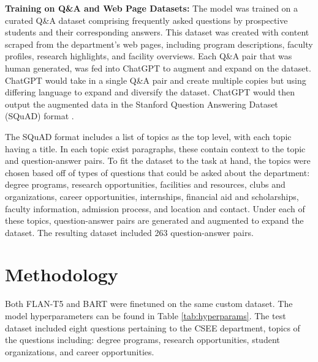 \documentclass[conference]{IEEEtran}
\begin{document}
\noindent
\textbf{Training on Q\&A and Web Page Datasets:} The model was trained on a curated Q\&A dataset comprising frequently asked questions by prospective students and their corresponding answers. 
This dataset was created with content scraped from the department's web pages, including program descriptions, faculty profiles, research highlights, and facility overviews. 
Each Q\&A pair that was human generated, was fed into ChatGPT to augment and expand on the dataset. ChatGPT would take in a single Q\&A pair and create multiple copies but using differing language to expand and diversify the dataset.
ChatGPT would then output the augmented data in the Stanford Question Answering Dataset (SQuAD) format \cite{b8}.

The SQuAD format includes a list of topics as the top level, with each topic having a title. In each topic exist paragraphs, these contain context to the topic and question-answer pairs.
To fit the dataset to the task at hand, the topics were chosen based off of types of questions that could be asked about the department:
degree programs, research opportunities, facilities and resources, clubs and organizations, career opportunities, internships, financial aid and scholarships, faculty information, admission process, and location and contact.
Under each of these topics, question-answer pairs are generated and augmented to expand the dataset. 
The resulting dataset included 263 question-answer pairs.

\section{Methodology}
Both FLAN-T5 and BART were finetuned on the same custom dataset. The model hyperparameters can be found in Table \ref{tab:hyperparams}.
The test dataset included eight questions pertaining to the CSEE department, topics of the questions including: degree programs, research opportunities, student organizations, and career opportunities. 
\end{document}
